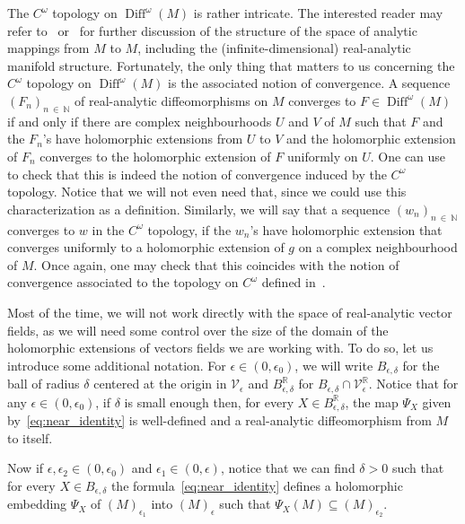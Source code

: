 \documentclass[10pt]{amsart}
\theoremstyle{definition}\newtheorem{defi}[theo]{Definition}\newtheorem{rema}[theo]{Remark}\newtheorem{exam}[theo]{Example}\newtheorem{exem}[theo]{Example}\newtheorem{nota}[theo]{Notation}
\DeclareMathOperator{\Diff}{Diff}
\newcommand{\clV}{\mathcal{V}}
\newcommand{\bbN}{\mathbb{N}}
\newcommand{\bbR}{\mathbb{R}}
\begin{document}
The $C^\omega$ topology on $\Diff^\omega(M)$ is rather intricate. The interested reader may refer to~\cite{kriegl_michor_real_analytic} or~\cite[Chapter~IX]{kriegl_michor_global_analysis} for further discussion of the structure of the space of analytic mappings from $M$ to $M$, including the (infinite-dimensional) real-analytic manifold structure. Fortunately, the only thing that matters to us concerning the $C^\omega$ topology on $\Diff^\omega(M)$ is the associated notion of convergence. A sequence $(F_n)_{n~\in~\bbN}$ of real-analytic diffeomorphisms on $M$ converges to $F \in \Diff^\omega(M)$ if and only if there are complex neighbourhoods $U$ and $V$ of $M$ such that $F$ and the $F_n$'s have holomorphic extensions from $U$ to $V$ and the holomorphic extension of $F_n$ converges to the holomorphic extension of $F$ uniformly on $U$. One can use~\cite[7.5]{lokalkonvexe} to check that this is indeed the notion of convergence induced by the $C^\omega$ topology. Notice that we will not even need that, since we could use this characterization as a definition. Similarly, we will say that a sequence $(w_n)_{n~\in~\bbN}$ converges to $w$ in the $C^\omega$ topology, if the $w_n$'s have holomorphic extension that converges uniformly to a holomorphic extension of $g$ on a complex neighbourhood of $M$. Once again, one may check that this coincides with the notion of convergence associated to the topology on $C^\omega$ defined in~\cite[\S~3]{kriegl_michor_real_analytic}.

Most of the time, we will not work directly with the space of real-analytic vector fields, as we will need some control over the size of the domain of the holomorphic extensions of vectors fields we are working with. To do so, let us introduce some additional notation. For $\epsilon \in (0,\epsilon_0)$, we will write $B_{\epsilon,\delta}$ for the ball of radius $\delta$ centered at the origin in $\clV_\epsilon$ and $B_{\epsilon,\delta}^{\bbR}$ for $ B_{\epsilon,\delta} \cap \clV_\epsilon^{\bbR}$. Notice that for any $\epsilon \in (0,\epsilon_0)$, if $\delta$ is small enough then, for every $X \in B_{\epsilon,\delta}^{\bbR}$, the map $\Psi_X$ given by~\eqref{eq:near_identity} is well-defined and a real-analytic diffeomorphism from $M$ to itself.

Now if $\epsilon,\epsilon_2 \in (0, \epsilon_0)$ and $\epsilon_1 \in (0,\epsilon)$, notice that we can find $\delta > 0$ such that for every $X \in B_{\epsilon,\delta}$ the formula~\eqref{eq:near_identity} defines a holomorphic embedding $\Psi_X$ of $(M)_{\epsilon_1}$ into $(M)_\epsilon$ such that $\Psi_X(M) \subseteq (M)_{\epsilon_2}$.
\end{document}
